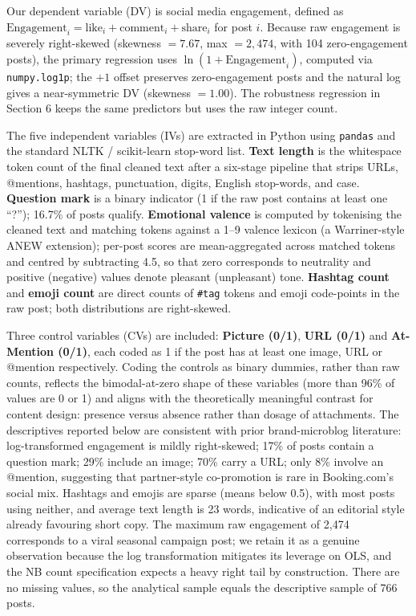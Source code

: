 \documentclass[12pt,a4paper]{article}
\begin{document}
Our dependent variable (DV) is social media engagement, defined as $\text{Engagement}_i = \text{like}_i + \text{comment}_i + \text{share}_i$ for post $i$. Because raw engagement is severely right-skewed (skewness $=7.67$, max $=2{,}474$, with 104 zero-engagement posts), the primary regression uses $\ln(1+\text{Engagement}_i)$, computed via \texttt{numpy.log1p}; the $+1$ offset preserves zero-engagement posts and the natural log gives a near-symmetric DV (skewness $=1.00$). The robustness regression in Section 6 keeps the same predictors but uses the raw integer count.

The five independent variables (IVs) are extracted in Python using \texttt{pandas} and the standard NLTK / scikit-learn stop-word list. \textbf{Text length} is the whitespace token count of the final cleaned text after a six-stage pipeline that strips URLs, @mentions, hashtags, punctuation, digits, English stop-words, and case. \textbf{Question mark} is a binary indicator (1 if the raw post contains at least one ``?''); 16.7\% of posts qualify. \textbf{Emotional valence} is computed by tokenising the cleaned text and matching tokens against a 1--9 valence lexicon (a Warriner-style ANEW extension); per-post scores are mean-aggregated across matched tokens and centred by subtracting 4.5, so that zero corresponds to neutrality and positive (negative) values denote pleasant (unpleasant) tone. \textbf{Hashtag count} and \textbf{emoji count} are direct counts of \texttt{\#tag} tokens and emoji code-points in the raw post; both distributions are right-skewed.

Three control variables (CVs) are included: \textbf{Picture (0/1)}, \textbf{URL (0/1)} and \textbf{At-Mention (0/1)}, each coded as 1 if the post has at least one image, URL or @mention respectively. Coding the controls as binary dummies, rather than raw counts, reflects the bimodal-at-zero shape of these variables (more than 96\% of values are 0 or 1) and aligns with the theoretically meaningful contrast for content design: presence versus absence rather than dosage of attachments. The descriptives reported below are consistent with prior brand-microblog literature: log-transformed engagement is mildly right-skewed; 17\% of posts contain a question mark; 29\% include an image; 70\% carry a URL; only 8\% involve an @mention, suggesting that partner-style co-promotion is rare in Booking.com's social mix. Hashtags and emojis are sparse (means below 0.5), with most posts using neither, and average text length is 23 words, indicative of an editorial style already favouring short copy. The maximum raw engagement of 2{,}474 corresponds to a viral seasonal campaign post; we retain it as a genuine observation because the log transformation mitigates its leverage on OLS, and the NB count specification expects a heavy right tail by construction. There are no missing values, so the analytical sample equals the descriptive sample of 766 posts.
\end{document}
